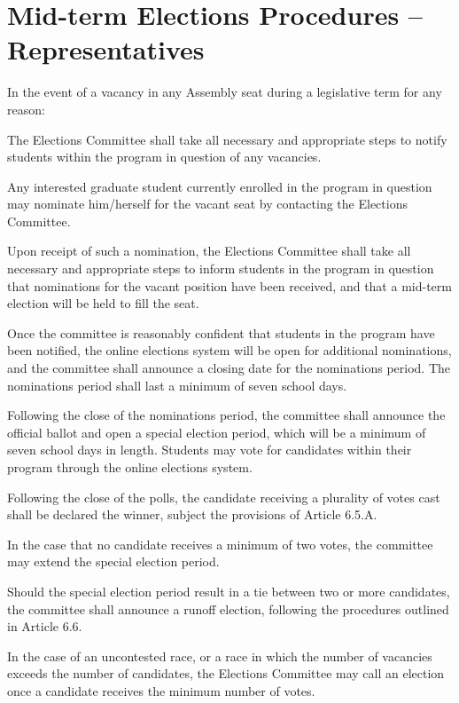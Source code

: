 \section{Mid-term Elections Procedures – Representatives}
In the event of a vacancy in any Assembly seat during a legislative term for any reason:
\begin{bylaws-number}
  \item The Elections Committee shall take all necessary and appropriate steps to notify students within the program in question of any vacancies.
  \item Any interested graduate student currently enrolled in the program in question may nominate him/herself for the vacant seat by contacting the Elections Committee.
  \item Upon receipt of such a nomination, the Elections Committee shall take all necessary and appropriate steps to inform students in the program in question that nominations for the vacant position have been received, and that a mid-term election will be held to fill the seat.
  \item Once the committee is reasonably confident that students in the program have been notified, the online elections system will be open for additional nominations, and the committee shall announce a closing date for the nominations period. The nominations period shall last a minimum of seven school days.
  \item Following the close of the nominations period, the committee shall announce the official ballot and open a special election period, which will be a minimum of seven school days in length. Students may vote for candidates within their program through the online elections system.
  \item Following the close of the polls, the candidate receiving a plurality of votes cast shall be declared the winner, subject the provisions of Article 6.5.A.
  \begin{bylaws-number}
   \item In the case that no candidate receives a minimum of two votes, the committee may extend the special election period.
   \item Should the special election period result in a tie between two or more candidates, the committee shall announce a runoff election, following the procedures outlined in Article 6.6.
   \item In the case of an uncontested race, or a race in which the number of vacancies exceeds the number of candidates, the Elections Committee may call an election once a candidate receives the minimum number of votes.

\end{bylaws-number}
\end{bylaws-number}
